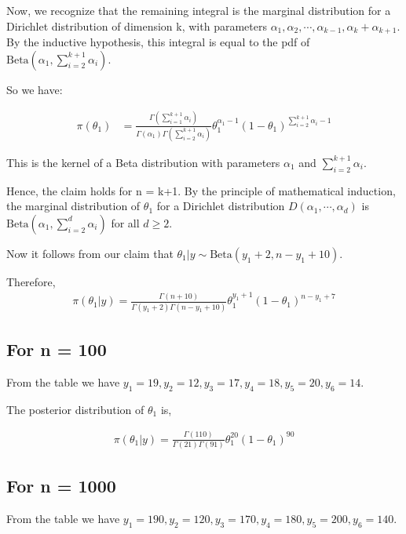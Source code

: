 \documentclass[a4paper]{article}
\begin{document}
Now, we recognize that the remaining integral is the marginal distribution for a Dirichlet distribution of dimension k, with parameters \(\alpha_1, \alpha_2, \cdots, \alpha_{k-1}, \alpha_k + \alpha_{k+1}\). By the inductive hypothesis, this integral is equal to the pdf of \(\text{Beta}\left(\alpha_1,\sum_{i=2}^{k+1}\alpha_i\right)\). 

So we have:

\begin{align*}
    \pi(\theta_1) &= \frac{\Gamma(\sum_{i=1}^{k+1} \alpha_i)}{\Gamma(\alpha_1) \Gamma(\sum_{i=2}^{k+1} \alpha_i)} \theta_1^{\alpha_1 - 1} (1 - \theta_1)^{\sum_{i=2}^{k+1} \alpha_i - 1}
\end{align*}

This is the kernel of a Beta distribution with parameters \(\alpha_1\) and \(\sum_{i=2}^{k+1} \alpha_i\).

Hence, the claim holds for n = k+1. By the principle of mathematical induction, the marginal distribution of \(\theta_1\) for a Dirichlet distribution \(D(\alpha_1, \cdots, \alpha_d)\) is \(\text{Beta}(\alpha_1, \sum_{i=2}^{d} \alpha_i)\) for all \(d \geq 2\).

\vspace{0.25cm}

Now it follows from our claim that \(\theta_1|y \sim \text{Beta}(y_1+2, n - y_1 + 10)\).

Therefore,
\begin{align*}
    \pi(\theta_1|y) = \frac{\Gamma(n+10)}{\Gamma(y_1+2)\Gamma(n-y_1+10)}\theta_1^{y_1+1}(1-\theta_1)^{n-y_1+7}
\end{align*}

\subsection*{For n = 100}
From the table we have \(y_1 = 19, y_2 = 12, y_3 = 17, y_4 = 18, y_5 = 20, y_6 =14 \).

The posterior distribution of \(\theta_1\) is,

\begin{align*}
    \pi(\theta_1|y) = \frac{\Gamma(110)}{\Gamma(21)\Gamma(91)}\theta_1^{20}(1-\theta_1)^{90}
\end{align*}

\subsection*{For n = 1000}
From the table we have \(y_1 = 190, y_2 = 120, y_3 = 170, y_4 = 180, y_5 = 200, y_6 =140 \).
\end{document}
